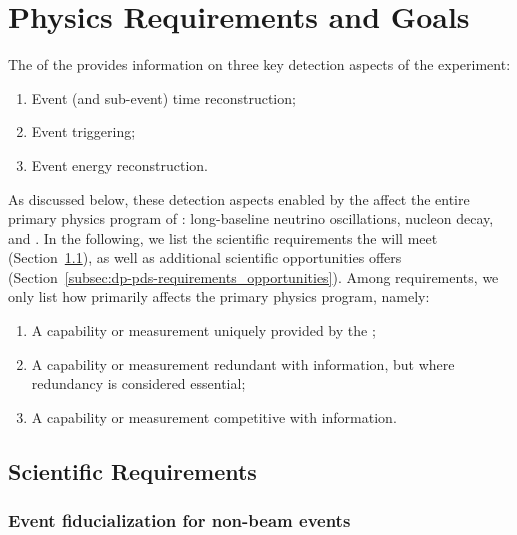 \section{Physics Requirements and Goals}
\label{sec:dp-pds-requirements}

The  of the \dune {} provides information on three key detection aspects of the experiment:

\begin{enumerate}
\item Event (and sub-event) time reconstruction;
\item Event triggering;
\item Event energy reconstruction.
\end{enumerate}

As discussed below, these detection aspects enabled by the  affect the entire primary physics program of \dune: long-baseline neutrino oscillations, nucleon decay, and . In the following, we list the scientific requirements the  will meet  (Section~\ref{subsec:dp-pds-requirements_requirements}), as well as additional scientific opportunities  offers (Section~\ref{subsec:dp-pds-requirements_opportunities}). Among requirements, we only list how  primarily affects the \dune primary physics program, namely: 
\begin{enumerate}
\item A capability or measurement uniquely provided by the ;
\item A capability or measurement redundant with  information, but where redundancy is considered essential;
\item A capability or measurement competitive with  information.
\end{enumerate}


\subsection{Scientific Requirements}
\label{subsec:dp-pds-requirements_requirements}

\subsubsection{Event fiducialization for non-beam events}

